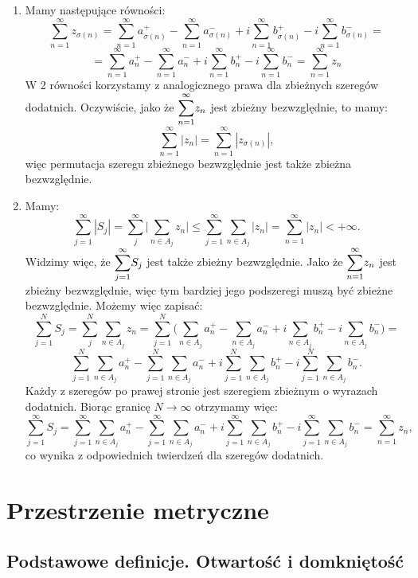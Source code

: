 \documentclass{article}
\newcounter{defi}
\numberwithin{defi}{section}
\numberwithin{defi}{section}
\newcommand{\oo}{\infty}
\begin{document}
\begin{dow}
    \begin{enumerate}
        \item Mamy następujące równości:
              \[\sum_{n=1}^{\oo} z_{\sigma(n)} =  \sum_{n=1}^{\oo} a_{\sigma(n)}^+ - \sum_{n=1}^{\oo} a_{\sigma(n)}^- + i\sum_{n=1}^{\oo} b_{\sigma(n)}^+ -i\sum_{n=1}^{\oo}b_{\sigma(n)}^- =\]
              \[= \sum_{n=1}^{\oo} a_n^+ - \sum_{n=1}^{\oo} a_n^- + i\sum_{n=1}^{\oo} b_n^+ -i\sum_{n=1}^{\oo}b_n^- = \sum_{n=1}^{\oo} z_n\]
              W 2 równości korzystamy z analogicznego prawa dla zbieżnych szeregów dodatnich.
              Oczywiście, jako że $\mathlarger{\sum}_{n=1}^{\oo} z_n$ jest zbieżny bezwzględnie, to mamy:
              \[\sum_{n=1}^{\oo} |z_n| = \sum_{n=1}^{\oo} |z_{\sigma(n)}|,\]
              więc permutacja szeregu zbieżnego bezwzględnie jest także zbieżna bezwzględnie.

        \item Mamy:
              \[\sum_{j=1}^{\oo} |S_j| = \sum_j^{\oo} \Big| \sum_{n \in A_j} z_n \Big| \leqslant \sum_{j=1}^{\oo} \sum_{n \in A_j} |z_n| =\sum_{n=1}^{\oo} |z_n| < + \oo. \]
              Widzimy więc, że $\mathlarger{\sum}_{j=1}^{\oo} S_j$ jest także zbieżny bezwzględnie.
              Jako że $\mathlarger{\sum}_{n=1}^{\oo} z_n$ jest zbieżny bezwzględnie, więc tym bardziej jego podszeregi muszą być zbieżne bezwzględnie. Możemy więc zapisać:
              \[\sum_{j=1}^{N} S_j = \sum_j^{N} \sum_{n \in A_j} z_n = \sum_{j=1}^N \Big(\sum_{n \in A_j} a_n^+ - \sum_{n \in A_j} a_n^- + i\sum_{n \in A_j} b_n^+ -i\sum_{n \in A_j} b_n^- \Big) =\]
              \[\sum_{j=1}^N\sum_{n \in A_j} a_n^+ - \sum_{j=1}^N\sum_{n \in A_j} a_n^- + i\sum_{j=1}^N\sum_{n \in A_j} b_n^+ -i\sum_{j=1}^N\sum_{n \in A_j} b_n^-.\]
              Każdy z szeregów po prawej stronie jest szeregiem zbieżnym o wyrazach dodatnich. Biorąc granicę $N \to \oo$ otrzymamy więc:
              \[\sum_{j=1}^{\oo} S_j = \sum_{j=1}^\oo\sum_{n \in A_j} a_n^+ - \sum_{j=1}^\oo\sum_{n \in A_j} a_n^- + i\sum_{j=1}^\oo\sum_{n \in A_j} b_n^+ -i\sum_{j=1}^\oo\sum_{n \in A_j} b_n^- = \sum_{n=1}^\oo z_n,\]
              co wynika z odpowiednich twierdzeń dla szeregów dodatnich.
    \end{enumerate}
\end{dow}

\newpage
\section{Przestrzenie metryczne}
\subsection{Podstawowe definicje. Otwartość i domkniętość}
\end{document}
